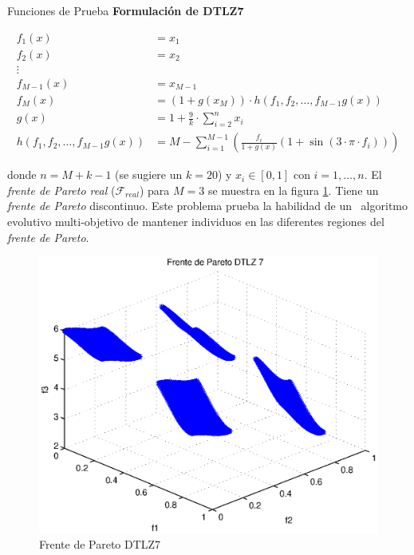 \begin{chapter}{Funciones de Prueba}
\textbf{Formulaci\'on de DTLZ7}

\begin{align*}
f_1(x)&=x_1 \\
f_2(x)&=x_2\\
\vdots&\\
f_{M-1}(x)&=x_{M-1}\\
f_{M}(x)&=(1+g(x_M))\cdot h(f_1,f_2,\dots,f_{M-1}g(x))\\
g(x)&=1+\frac{9}{k}\cdot\sum_{i=2}^nx_i\\
h(f_1,f_2,\dots,f_{M-1}g(x))&=M-\sum_{i=1}^{M-1}(\frac{f_i}{1+g(x)}(1+\sin{(3\cdot\pi\cdot f_i)}))
\end{align*}


donde $n=M+k-1$ (se sugiere un $k=20$) y $x_i\in[0,1]$ con $i=1,\ldots,n$. El \textit{frente de Pareto real} ($\mathcal{F}_{real}$) para 
$M=3$ se muestra en la figura \ref{fig:DTLZ7}. Tiene un {\it frente de Pareto} discontinuo. Este problema prueba la habilidad de un \
algoritmo evolutivo multi-objetivo de mantener individuos en las diferentes regiones del {\it frente de Pareto}.

\begin{figure}[h!]
 \centering
\includegraphics[scale=0.4]{ApendiceA/paretoDTLZ7.eps}
\caption{Frente de Pareto DTLZ7}
\label{fig:DTLZ7}
\end{figure}

\end{chapter}



















